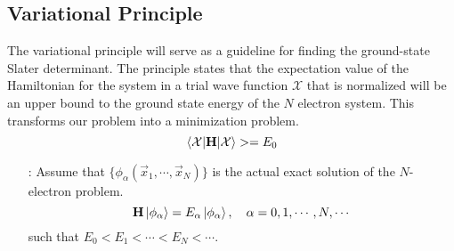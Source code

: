 \documentclass[12pt,a4paper,titlepage]{article}
\newcommand\hruleMod{%
	\vskip12pt
	\nointerlineskip
	{\color{lightgray}\leaders\vrule width \textwidth\vskip0.4pt}
	\nointerlineskip
	\vskip12pt
}
\newcommand{\aside}[3][]{ %
	\ifthenelse{\equal{#1}{}}{\hruleMod}{}
	\begin{itemize}[align=left,labelindent=0em,labelwidth=3em,labelsep*=0.5em,leftmargin=!]
		\item[\ul{#2}:]{#3}
	\end{itemize}
	\ifthenelse{\equal{#1}{}}{\hruleMod}{}
}
\newcommand{\ul}[1]{\underline{\smash{#1}}} %
\newcommand{\Chi}{\mathcal{X}} %
\begin{document}
\subsection{Variational Principle}
The variational principle will serve as a guideline for finding the ground-state Slater determinant. The principle states that the expectation value of the Hamiltonian for the system in a trial wave function $\Chi$ that is normalized will be an upper bound to the ground state energy of the $N$ electron system. This transforms our problem into a minimization problem.
\begin{equation}
\mel{\Chi}{\vb{H}}{\Chi}>=E_{0}
\end{equation}
\aside{Proof}{Assume that $\{\phi_{\alpha}(\vec{x}_{1},\cdots,\vec{x}_{N})\}$ is the actual exact solution of the $N$-electron problem.
\begin{equation}
\vb{H}\ket{\phi_{\alpha}}=E_{\alpha}\ket{\phi_{\alpha}},\quad\alpha=0,1,\cdots,N,\cdots
\end{equation}
such that $E_{0}<E_{1}<\cdots<E_{N}<\cdots$.\\

}
\end{document}
